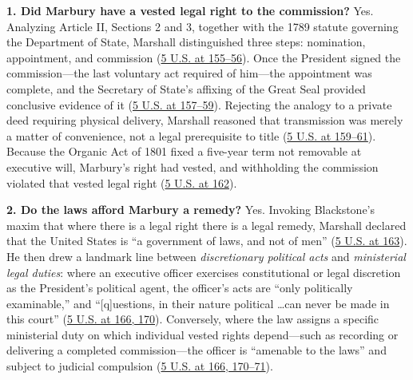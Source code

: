 \documentclass[12pt]{article}
\begin{document}
\textbf{1. Did Marbury have a vested legal right to the commission?} Yes. Analyzing Article II, Sections 2 and 3, together with the 1789 statute governing the Department of State, Marshall distinguished three steps: nomination, appointment, and commission (\href{https://supreme.justia.com/cases/federal/us/5/137/}{5 U.S. at 155--56}). Once the President signed the commission---the last voluntary act required of him---the appointment was complete, and the Secretary of State's affixing of the Great Seal provided conclusive evidence of it (\href{https://supreme.justia.com/cases/federal/us/5/137/}{5 U.S. at 157--59}). Rejecting the analogy to a private deed requiring physical delivery, Marshall reasoned that transmission was merely a matter of convenience, not a legal prerequisite to title (\href{https://supreme.justia.com/cases/federal/us/5/137/}{5 U.S. at 159--61}). Because the Organic Act of 1801 fixed a five-year term not removable at executive will, Marbury's right had vested, and withholding the commission violated that vested legal right (\href{https://supreme.justia.com/cases/federal/us/5/137/}{5 U.S. at 162}).

\textbf{2. Do the laws afford Marbury a remedy?} Yes. Invoking Blackstone's maxim that where there is a legal right there is a legal remedy, Marshall declared that the United States is ``a government of laws, and not of men'' (\href{https://supreme.justia.com/cases/federal/us/5/137/}{5 U.S. at 163}). He then drew a landmark line between \textit{discretionary political acts} and \textit{ministerial legal duties}: where an executive officer exercises constitutional or legal discretion as the President's political agent, the officer's acts are ``only politically examinable,'' and ``[q]uestions, in their nature political \dots can never be made in this court'' (\href{https://supreme.justia.com/cases/federal/us/5/137/}{5 U.S. at 166, 170}). Conversely, where the law assigns a specific ministerial duty on which individual vested rights depend---such as recording or delivering a completed commission---the officer is ``amenable to the laws'' and subject to judicial compulsion (\href{https://supreme.justia.com/cases/federal/us/5/137/}{5 U.S. at 166, 170--71}).
\end{document}
